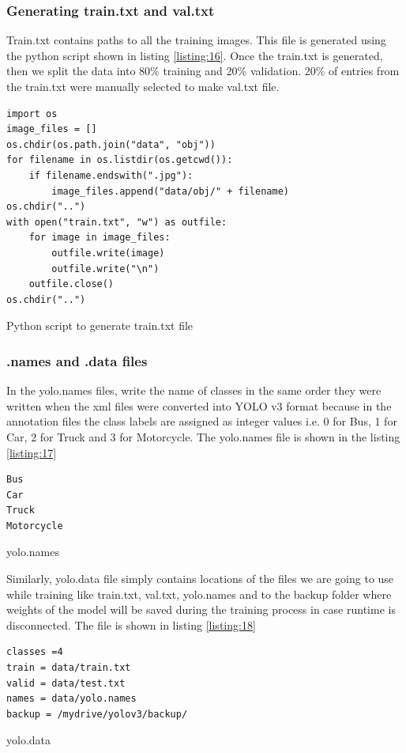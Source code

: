 \subsubsection{Generating train.txt and val.txt}
Train.txt contains paths to all the training images. This file is generated using the python script shown in listing \ref{listing:16}. Once the train.txt is generated, then we split the data into 80\% training and 20\% validation.
20\% of entries from the train.txt were manually selected to make val.txt file.
\begin{longlisting}
\begin{verbatim}
import os
image_files = []
os.chdir(os.path.join("data", "obj"))
for filename in os.listdir(os.getcwd()):
    if filename.endswith(".jpg"):
        image_files.append("data/obj/" + filename)
os.chdir("..")
with open("train.txt", "w") as outfile:
    for image in image_files:
        outfile.write(image)
        outfile.write("\n")
    outfile.close()
os.chdir("..")
\end{verbatim}
\caption{Python script to generate train.txt file}
\label{listing:16}
\end{longlisting}
\subsubsection{.names and .data files}
In the yolo.names files, write the name of classes in the same order they were written when the xml files were converted into YOLO v3 format because in the annotation files the class labels are assigned as integer values i.e. 0 for Bus, 1 for Car, 2 for Truck and 3 for Motorcycle. The yolo.names file is shown in the listing \ref{listing:17}
\begin{longlisting}
\begin{verbatim}
Bus
Car
Truck 
Motorcycle
\end{verbatim}
\caption{yolo.names}
\label{listing:17}
\end{longlisting}
Similarly, yolo.data file simply contains locations of the files we are going to use while training like train.txt, val.txt, yolo.names and to the backup folder where weights of the model will be saved during the training process in case runtime is disconnected. The file is shown in listing \ref{listing:18}
\begin{longlisting}
\begin{verbatim}
classes =4
train = data/train.txt
valid = data/test.txt
names = data/yolo.names 
backup = /mydrive/yolov3/backup/
\end{verbatim}
\caption{yolo.data}
\label{listing:18}
\end{longlisting}
